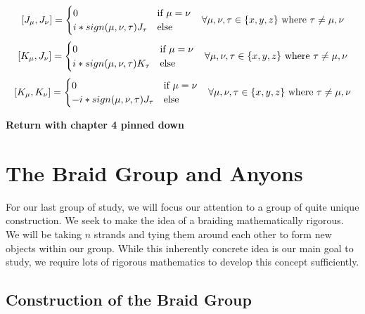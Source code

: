 \documentclass[10pt]{ucthesis}
\begin{document}
\begin{equation}
\begin{aligned}
	[J_\mu,J_\nu] = \begin{cases}
							0 &\text{if } \mu=\nu \\
							i*sign(\mu,\nu,\tau)J_\tau & \text{else}
						\end{cases} \hspace{3mm} \forall \mu,\nu,\tau\in\{x,y,z\}\text{ where }\tau \neq\mu,\nu
\end{aligned}
\end{equation}
\begin{equation}
\begin{aligned}
	[K_\mu,J_\nu] = \begin{cases}
							0 &\text{if } \mu=\nu \\
							i*sign(\mu,\nu,\tau)K_\tau & \text{else}
						\end{cases} \hspace{3mm} \forall \mu,\nu,\tau\in\{x,y,z\}\text{ where }\tau \neq\mu,\nu
\end{aligned}
\end{equation}
\begin{equation}
\begin{aligned}
	[K_\mu,K_\nu] = \begin{cases}
							0 &\text{if } \mu=\nu \\
							-i*sign(\mu,\nu,\tau)J_\tau & \text{else}
						\end{cases} \hspace{3mm} \forall \mu,\nu,\tau\in\{x,y,z\}\text{ where }\tau \neq\mu,\nu
\end{aligned}
\end{equation}

\textbf{Return with chapter 4 pinned down}


\chapter{The Braid Group and Anyons}

For our last group of study, we will focus our attention to a group of quite unique construction. We seek to make the idea of a braiding mathematically rigorous. We will be taking $n$ strands and tying them around each other to form new objects within our group. While this inherently concrete idea is our main goal to study, we require lots of rigorous mathematics to develop this concept sufficiently. 

\section{Construction of the Braid Group}
\end{document}
